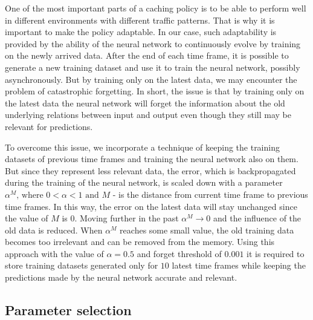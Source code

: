 One of the most important parts of a caching policy is to be able to perform well in different environments with different traffic patterns. That is why it is important to make the policy adaptable. In our case, such adaptability is provided by the ability of the neural network to continuously evolve by training on the newly arrived data. After the end of each time frame, it is possible to generate a new training dataset and use it to train the neural network, possibly asynchronously. But by training only on the latest data, we may encounter the problem of catastrophic forgetting\cite{16, 17}. In short, the issue is that by training only on the latest data the neural network will forget the information about the old underlying relations between input and output even though they still may be relevant for predictions. 

To overcome this issue, we incorporate a technique of keeping the training datasets of previous time frames and training the neural network also on them. But since they represent less relevant data, the error, which is backpropagated during the training of the neural network, is scaled down with a parameter $\alpha^M \text{, where } 0 < \alpha < 1 \text{ and } M$ - is the distance from current time frame to previous time frames. In this way, the error on the latest data will stay unchanged since the value of $M$ is $0$. Moving further in the past $\alpha^M \rightarrow 0$ and the influence of the old data is reduced. When $\alpha^M$ reaches some small value, the old training data becomes too irrelevant and can be removed from the memory. Using this approach with the value of $\alpha = 0.5$ and forget threshold of $0.001$ it is required to store training datasets generated only for $10$ latest time frames while keeping the predictions made by the neural network accurate and relevant.

\subsection{Parameter selection}

